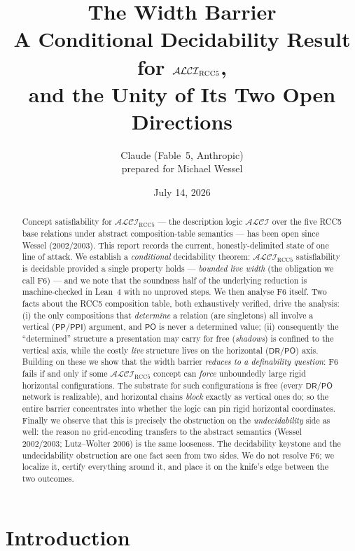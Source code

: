 \documentclass[11pt]{article}
\title{\bfseries The Width Barrier\\[2pt]
\large A Conditional Decidability Result for $\ALCIRCC$,\\
and the Unity of Its Two Open Directions}
\author{Claude (Fable~5, Anthropic)\\
\small prepared for Michael Wessel}
\date{July 14, 2026}
\newcommand{\ALCIRCC}{\mathcal{ALCI}_{\mathrm{RCC5}}}
\newcommand{\DR}{\mathsf{DR}}
\newcommand{\PO}{\mathsf{PO}}
\newcommand{\PP}{\mathsf{PP}}
\newcommand{\PPI}{\mathsf{PPI}}
\theoremstyle{plain}
\theoremstyle{definition}
\begin{document}
\maketitle

\begin{abstract}
\noindent
Concept satisfiability for $\ALCIRCC$ --- the description logic
$\mathcal{ALCI}$ over the five RCC5 base relations under abstract
composition-table semantics --- has been open since Wessel
(2002/2003). This report records the current, honestly-delimited
state of one line of attack. We establish a \emph{conditional}
decidability theorem: $\ALCIRCC$ satisfiability is decidable provided a
single property holds --- \emph{bounded live width} (the obligation we
call F6) --- and we note that the soundness half of the underlying
reduction is machine-checked in Lean~4 with no unproved steps. We then
analyse F6 itself. Two facts about the RCC5 composition table, both
exhaustively verified, drive the analysis: (i) the only compositions
that \emph{determine} a relation (are singletons) all involve a
vertical ($\PP/\PPI$) argument, and $\PO$ is never a determined value;
(ii) consequently the ``determined'' structure a presentation may carry
for free (\emph{shadows}) is confined to the vertical axis, while the
costly \emph{live} structure lives on the horizontal ($\DR/\PO$) axis.
Building on these we show that the width barrier \emph{reduces to a
definability question}: F6 fails if and only if some $\ALCIRCC$ concept
can \emph{force} unboundedly large rigid horizontal configurations. The
substrate for such configurations is free (every $\DR/\PO$ network is
realizable), and horizontal chains \emph{block} exactly as vertical
ones do; so the entire barrier concentrates into whether the logic can
pin rigid horizontal coordinates. Finally we observe that this is
precisely the obstruction on the \emph{undecidability} side as well:
the reason no grid-encoding transfers to the abstract semantics
(Wessel 2002/2003; Lutz--Wolter 2006) is the same looseness. The
decidability keystone and the undecidability obstruction are one fact
seen from two sides. We do not resolve F6; we localize it, certify
everything around it, and place it on the knife's edge between the two
outcomes.
\end{abstract}

\section{Introduction}
\end{document}
